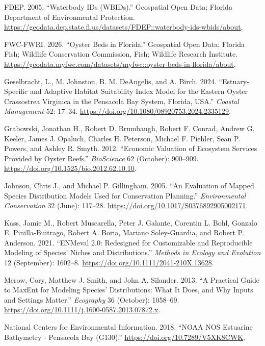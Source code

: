 \documentclass[
  letterpaper,
  DIV=11,
  numbers=noendperiod]{scrartcl}
\newlength{\cslhangindent}
\newenvironment{CSLReferences}[2] %
 {\begin{list}{}{%
  \setlength{\itemindent}{0pt}
  \setlength{\leftmargin}{0pt}
  \setlength{\parsep}{0pt}
  \ifodd #1
   \setlength{\leftmargin}{\cslhangindent}
   \setlength{\itemindent}{-1\cslhangindent}
  \fi
  \setlength{\itemsep}{#2\baselineskip}}}
 {\end{list}}
\begin{document}
\begin{CSLReferences}{1}{0}
FDEP. 2005. {``Waterbody IDs (WBIDs).''} Geospatial Open Data; Florida
Department of Environmental Protection.
\url{https://geodata.dep.state.fl.us/datasets/FDEP::waterbody-ids-wbids/about}.

FWC-FWRI. 2026. {``Oyster Beds in Florida.''} Geospatial Open Data;
Florida Fish; Wildlife Conservation Commission, Fish; Wildlife Research
Institute.
\url{https://geodata.myfwc.com/datasets/myfwc::oyster-beds-in-florida/about}.

Geselbracht, L., M. Johnston, B. M. DeAngelis, and A. Birch. 2024.
{``Estuary-Specific and Adaptive Habitat Suitability Index Model for the
Eastern Oyster Crassostrea Virginica in the Pensacola Bay System,
Florida, USA.''} \emph{Coastal Management} 52: 17--34.
\url{https://doi.org/10.1080/08920753.2024.2335129}.

Grabowski, Jonathan H., Robert D. Brumbaugh, Robert F. Conrad, Andrew G.
Keeler, James J. Opaluch, Charles H. Peterson, Michael F. Piehler, Sean
P. Powers, and Ashley R. Smyth. 2012. {``Economic Valuation of Ecosystem
Services Provided by Oyster Reefs.''} \emph{BioScience} 62 (October):
900--909. \url{https://doi.org/10.1525/bio.2012.62.10.10}.

Johnson, Chris J., and Michael P. Gillingham. 2005. {``An Evaluation of
Mapped Species Distribution Models Used for Conservation Planning.''}
\emph{Environmental Conservation} 32 (June): 117--28.
\url{https://doi.org/10.1017/S0376892905002171}.

Kass, Jamie M., Robert Muscarella, Peter J. Galante, Corentin L. Bohl,
Gonzalo E. Pinilla-Buitrago, Robert A. Boria, Mariano Soley-Guardia, and
Robert P. Anderson. 2021. {``ENMeval 2.0: Redesigned for Customizable
and Reproducible Modeling of Species' Niches and Distributions.''}
\emph{Methods in Ecology and Evolution} 12 (September): 1602--8.
\url{https://doi.org/10.1111/2041-210X.13628}.

Merow, Cory, Matthew J. Smith, and John A. Silander. 2013. {``A
Practical Guide to MaxEnt for Modeling Species' Distributions: What It
Does, and Why Inputs and Settings Matter.''} \emph{Ecography} 36
(October): 1058--69.
\url{https://doi.org/10.1111/j.1600-0587.2013.07872.x}.

National Centers for Environmental Information. 2018. {``NOAA NOS
Estuarine Bathymetry - Pensacola Bay (G130).''}
\url{https://doi.org/10.7289/V5XK8CWK}.


\end{CSLReferences}
\end{document}
